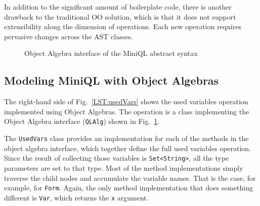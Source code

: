 
In addition to the significant amount of boilerplate code, there is
another drawback to the traditional OO solution, which is that it does
not support extensibility along the dimension of operations. Each new
operation requires pervasive changes across the AST classes.



\begin{figure}[t]
\nocaptionrule
\caption{Object Algebra interface of the MiniQL abstract syntax}
\label{ql_tree}
\end{figure}

\subsection{Modeling MiniQL with Object Algebras}\label{subsec:model_ql_with_oa}


The right-hand side of Fig.~\ref{LST:usedVars} shows the used
variables operation implemented using Object Algebras. The operation
is a class implementing the Object Algebra interface
(\lstinline{QLAlg}) shown in Fig.~\ref{ql_tree}.


The \lstinline{UsedVars} class provides an implementation for each
of the methods in the object algebra interface, which together define the
full used variables operation. Since the result of collecting those
variables is \lstinline{Set<String>}, all the type parameters are set to
that type. Most of the method implementations simply traverse the
child nodes and accumulate the variable names. That is the case, for
example, for \lstinline{Form}. Again, the only method implementation that does
something different is \lstinline{Var}, which returns the \lstinline{x}
argument.

